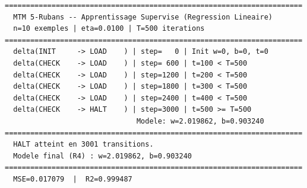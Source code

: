 \documentclass[12pt, a4paper, oneside]{report}
\begin{document}
\begin{tcolorbox}[
  colback=black!92, colframe=inptblue,
  fontupper=\ttfamily\small\color{green!60!white},
  title={\color{white}\textbf{Sortie console -- Expérience 1}},
  left=6pt, right=6pt
]
\begin{verbatim}
======================================================================
  MTM 5-Rubans -- Apprentissage Supervise (Regression Lineaire)
  n=10 exemples | eta=0.0100 | T=500 iterations
======================================================================
  delta(INIT     -> LOAD    ) | step=   0 | Init w=0, b=0, t=0
  delta(CHECK    -> LOAD    ) | step= 600 | t=100 < T=500
  delta(CHECK    -> LOAD    ) | step=1200 | t=200 < T=500
  delta(CHECK    -> LOAD    ) | step=1800 | t=300 < T=500
  delta(CHECK    -> LOAD    ) | step=2400 | t=400 < T=500
  delta(CHECK    -> HALT    ) | step=3000 | t=500 >= T=500
                               Modele: w=2.019862, b=0.903240
======================================================================
  HALT atteint en 3001 transitions.
  Modele final (R4) : w=2.019862, b=0.903240
======================================================================
  MSE=0.017079  |  R2=0.999487
\end{verbatim}
\end{tcolorbox}
\end{document}
